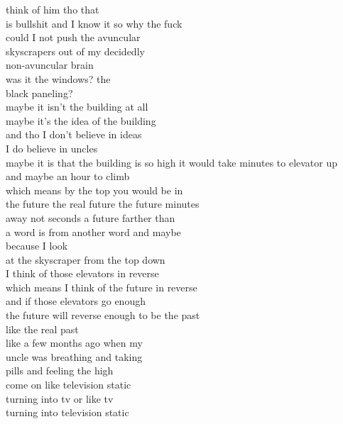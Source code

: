 \begin{flushleft}
\begin{paracol}{3}
think of him tho that\\
is bullshit and I know it so why the fuck\\
could I not push the avuncular\\
skyscrapers out of my decidedly\\
non-avuncular brain\\
was it the windows? the\\
black paneling?\\
maybe it isn’t the building at all\\
maybe it’s the idea of the building\\
and tho I don’t believe in ideas\\
I do believe in uncles\\
\switchcolumn[2]
maybe it is that the building
is so high it would take minutes to elevator up\\ %
and maybe an hour to climb\\
which means by the top you would be in\\
the future the real future the future minutes\\
away not seconds a future farther than\\
a word is from another word and maybe\\
because I look\\
at the skyscraper from the top down\\
I think of those elevators in reverse\\
which means I think of the future in reverse\\
and if those elevators go enough\\
the future will reverse enough to be the past\\
like the real past\\
like a few months ago when my\\
uncle was breathing and taking\\
pills and feeling the high\\
come on like television static\\
turning into tv or like tv\\
turning into television static
\end{paracol}
\end{flushleft}
\vfill
\hspace{0pt}